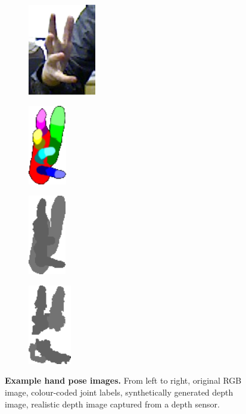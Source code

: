 \begin{figure}[th]
\centering
\begin{subfigure}[b]{0.22\linewidth}
	\centering
	\includegraphics[height=4cm]{fig/hand/fig1_rgb.png}
	\label{fig/hand/intro1}
\end{subfigure}
\begin{subfigure}[b]{0.22\linewidth}
	\centering
	\includegraphics[height=3.5cm]{fig/hand/fig1_a.png}
	\label{fig/hand/intro2}
\end{subfigure}
\begin{subfigure}[b]{0.22\linewidth}
	\centering
	\includegraphics[height=3.5cm]{fig/hand/fig1_c.png}
	\label{fig/hand/intro3}
\end{subfigure}
\begin{subfigure}[b]{0.22\linewidth}
	\centering
	\includegraphics[height=3.5cm]{fig/hand/fig1_b.png} 
	\label{fig/hand/intro4}
\end{subfigure}
\caption{\textbf{Example hand pose images.} From left to right, original RGB image, colour-coded joint labels, synthetically generated depth image, realistic depth image captured from a depth sensor.}
\label{fig/hand/intro}
\end{figure}


